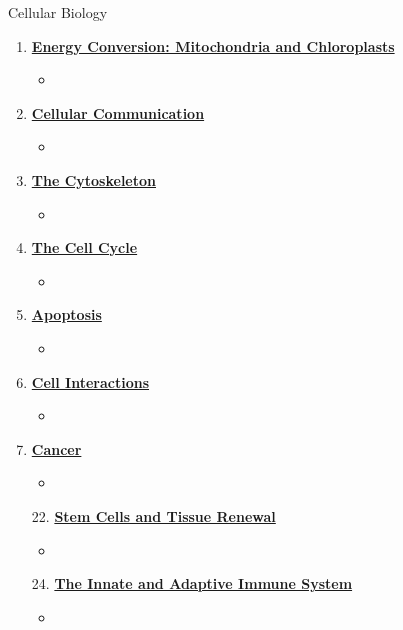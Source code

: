 \documentclass[12pt,letterpaper]{article}
\begin{document}
\begin{chapbox}{Cellular Biology}
{\begin{enumerate}[font=\bfseries, wide]
\begin{itemize}
        \item
    \end{itemize}
    \item \hyperlink{14}{\textbf{Energy Conversion: Mitochondria and Chloroplasts}}
    \begin{itemize}
        \item 
    \end{itemize}
    \item \hyperlink{15}{\textbf{Cellular Communication}}
    \begin{itemize}
        \item 
    \end{itemize}
    \item \hyperlink{16}{\textbf{The Cytoskeleton}}
    \begin{itemize}
        \item 
    \end{itemize}
    \item \hyperlink{17}{\textbf{The Cell Cycle}}
    \begin{itemize}
        \item 
    \end{itemize}
    \item \hyperlink{18}{\textbf{Apoptosis}}
    \begin{itemize}
        \item 
    \end{itemize}
    \item \hyperlink{19}{\textbf{Cell Interactions}}
    \begin{itemize}
        \item 
    \end{itemize}
    \item \hyperlink{20}{\textbf{Cancer}}
    \begin{itemize}
        \item 
    \end{itemize}    
    \item[22.] \hyperlink{22}{\textbf{Stem Cells and Tissue Renewal}}
    \begin{itemize}
        \item 
    \end{itemize}
    \item[24.] \hyperlink{24}{\textbf{The Innate and Adaptive Immune System}}
    \begin{itemize}
        \item 
    \end{itemize}
\end{enumerate}
}\end{chapbox}
\end{document}
